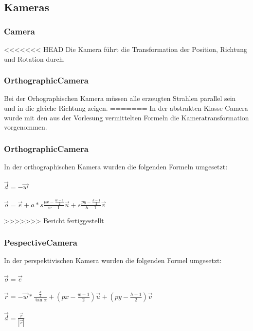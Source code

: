 \documentclass[14pt]{extarticle}
\begin{document}
\subsection{Kameras}
\subsubsection{Camera}
<<<<<<< HEAD
Die Kamera führt die Transformation der Position, Richtung und Rotation durch.
\subsubsection{OrthographicCamera}
Bei der Orhographischen Kamera müssen alle erzeugten Strahlen parallel sein und in die gleiche Richtung zeigen.
=======
In der abstrakten Klasse Camera wurde mit den aus der Vorlesung vermittelten Formeln die  Kameratransformation vorgenommen.

\subsubsection{OrthographicCamera}
In der orthographischen Kamera wurden die folgenden Formeln umgesetzt:\\\\
\begin{math}\vec{d}=-\vec{w}\end{math}\\\\
\begin{math}\vec{o}=\vec{e}+a*s\frac{px-\frac{w-1}{2}}{w-1}\vec{u}+s\frac{py-\frac{h-1}{2}}{h-1}\vec{v}\end{math}

>>>>>>> Bericht fertiggestellt
\subsubsection{PespectiveCamera}  
In der perspektivischen Kamera wurden die folgenden Formel umgesetzt:\\\\
\begin{math}\vec{o}=\vec{e}\end{math}\\\\
\begin{math}\vec{r}=-\vec{w}*\frac{\frac{h}{2}}{\tan\alpha}+(px-\frac{w-1}{2})\vec{u}+(py-\frac{h-1}{2})\vec{v}\end{math}\\\\
\begin{math}\vec{d}=\frac{\vec{r}}{|\vec{r}|}\end{math}\\\\
\end{document}
